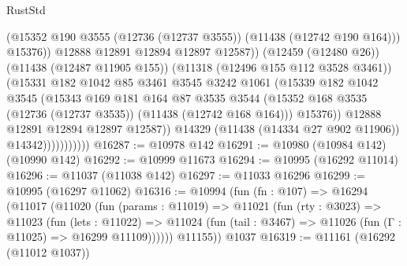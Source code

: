 \begin{lexlean}{RustStd}
\begin{coremodule}
                                    (@15352
                                      @190
                                      @3555
                                      (@12736 (@12737 @3555))
                                      (@11438 (@12742 @190 @164)))
                                    @15376))
                                @12888
                                @12891
                                @12894
                                @12897
                                @12587))
                            (@12459 (@12480 @26))
                            (@11438 (@12487 @11905 @155))
                            (@11318 (@12496 @155 @112 @3528 @3461))
                            (@15331
                              @182
                              @1042
                              @85
                              @3461
                              @3545
                              @3242
                              @1061
                              (@15339
                                @182
                                @1042
                                @3545
                                (@15343
                                  @169
                                  @181
                                  @164
                                  @87
                                  @3535
                                  @3544
                                  (@15352
                                    @168
                                    @3535
                                    (@12736 (@12737 @3535))
                                    (@11438 (@12742 @168 @164)))
                                  @15376))
                              @12888
                              @12891
                              @12894
                              @12897
                              @12587))
                          @14329
                          (@11438 (@14334 @27 @902 @11906))
                          @14342)))))))))))
@16287 := @10978 @142
@16291 := @10980 (@10984 @142) (@10990 @142)
@16292 := @10999 @11673
@16294 := @10995 (@16292 @11014)
@16296 := @11037 (@11038 @142)
@16297 := @11033 @16296
@16299 := @10995 (@16297 @11062)
@16316 := @10994
    (fun (fn : @107) =>
    @16294
      (@11017
        (@11020
          (fun (params : @11019) =>
          @11021
            (fun (rty : @3023) =>
            @11023
              (fun (lets : @11022) =>
              @11024 (fun (tail : @3467) => @11026 (fun (Γ : @11025) => @16299 @11109))))))
        @11155))
    @1037
@16319 := @11161 (@16292 (@11012 @1037))

\end{coremodule}
\end{lexlean}
